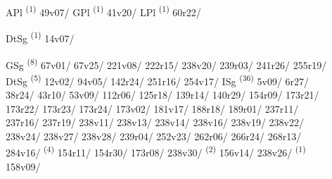 \noindent{} \LEMMALINE
\begin{description}
    \item[] APl \textsuperscript{(1)} \mbox{49v07/} \CASEBREAK GPl \textsuperscript{(1)} \mbox{41v20/} \CASEBREAK LPl \textsuperscript{(1)} \mbox{60r22/}
\end{description}
\ENTRYEND

\noindent{} \LEMMALINE
\begin{description}
    \item[] DtSg \textsuperscript{(1)} \mbox{14v07/}
\end{description}
\ENTRYEND

\noindent{} \LEMMALINE
\begin{description}
    \item[] GSg \textsuperscript{(8)} \mbox{67v01/} \mbox{67v25/} \mbox{221v08/} \mbox{222r15/} \mbox{238v20/} \mbox{239r03/} \mbox{241r26/} \mbox{255r19/} \CASEBREAK DtSg \textsuperscript{(5)} \mbox{12v02/} \mbox{94v05/} \mbox{142r24/} \mbox{251r16/} \mbox{254v17/} \CASEBREAK ISg \textsuperscript{(36)} \mbox{5v09/} \mbox{6r27/} \mbox{38r24/} \mbox{43r10/} \mbox{53v09/} \mbox{112r06/} \mbox{125r18/} \mbox{139r14/} \mbox{140r29/} \mbox{154r09/} \mbox{173r21/} \mbox{173r22/} \mbox{173r23/} \mbox{173r24/} \mbox{173v02/} \mbox{181v17/} \mbox{188r18/} \mbox{189r01/} \mbox{237r11/} \mbox{237r16/} \mbox{237r19/} \mbox{238v11/} \mbox{238v13/} \mbox{238v14/} \mbox{238v16/} \mbox{238v19/} \mbox{238v22/} \mbox{238v24/} \mbox{238v27/} \mbox{238v28/} \mbox{239r04/} \mbox{252v23/} \mbox{262r06/} \mbox{266r24/} \mbox{268r13/} \mbox{284v16/} \textsuperscript{(4)} \mbox{154r11/} \mbox{154r30/} \mbox{173r08/} \mbox{238v30/} \textsuperscript{(2)} \mbox{156v14/} \mbox{238v26/} \textsuperscript{(1)} \mbox{158v09/}
\end{description}
\ENTRYEND

